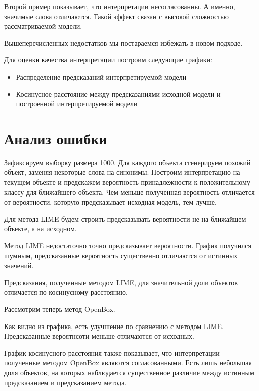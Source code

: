 \documentclass[a4paper, 12pt]{article}
\begin{document}
Второй пример показывает, что интерпретации несогласованны. А именно, значимые слова отличаются. Такой эффект связан с высокой сложностью рассматриваемой модели.

Вышеперечисленных недостатков мы постараемся избежать в новом подходе.

Для оценки качества интерпретации построим следующие графики:
\begin{itemize}
\item Распределение предсказаний интерпретируемой модели

\item Косинусное расстояние между предсказаниями исходной модели и построенной интерпретируемой модели
\end{itemize}

\section{Анализ ошибки}
Зафиксируем выборку размера 1000. Для каждого объекта сгенерируем похожий объект, заменяя некоторые слова на синонимы. Построим интерпретацию на текущем объекте и предскажем вероятность принадлежности к положительному классу для ближайшего объекта. Чем меньше полученная вероятность отличается от вероятности, которую предсказывает исходная модель, тем лучше.

Для метода LIME будем строить предсказывать вероятности не на ближайшем объекте, а на исходном.



Метод LIME недостаточно точно предсказывает вероятности. График получился шумным, предсказанные вероятность существенно отличаются от истинных значений.



Предсказания, полученные методом LIME, для значительной доли объектов отличается по косинусному расстоянию.

Рассмотрим теперь метод OpenBox.



Как видно из графика, есть улучшение по сравнению с методом LIME. Предсказанные вероятнсоти меньше отличаются от исходных.



График косинусного расстояния также показывает, что интерпретации полученные методом OpenBox являются согласованными. Есть лишь небольшая доля объектов, на которых наблюдается существенное различие между истинным предсказанием и предсказанием метода.
\end{document}
